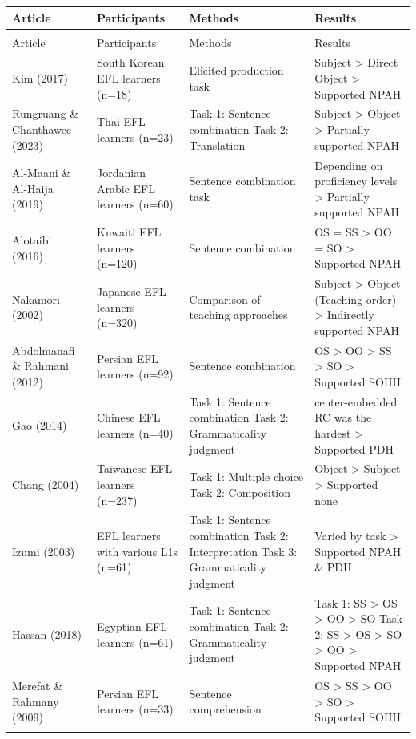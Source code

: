 \documentclass[
]{article}
\begin{document}
\begin{longtable}{>{\raggedright\arraybackslash}p{3cm}>{\raggedright\arraybackslash}p{3.5cm}>{\raggedright\arraybackslash}p{4.5cm}>{\raggedright\arraybackslash}p{5cm}}
\toprule
Article & Participants & Methods & Results\\
\midrule
\endfirsthead
\multicolumn{4}{@{}l}{\textit{(continued)}}\\
\toprule
Article & Participants & Methods & Results\\
\midrule
\endhead

\endfoot
\bottomrule
\endlastfoot
Kim (2017) & South Korean EFL learners (n=18) & Elicited production task & Subject > Direct Object
 > Supported \vphantom{2} NPAH\\
Rungruang \& Chanthawee (2023) & Thai EFL learners (n=23) & Task 1: Sentence combination
Task 2: Translation & Subject > Object
 > Partially supported NPAH\\
Al-Maani \& Al-Haija (2019) & Jordanian Arabic EFL learners (n=60) & Sentence combination task & Depending on proficiency levels 
> Partially supported NPAH\\
Alotaibi (2016) & Kuwaiti EFL learners (n=120) & Sentence combination & OS = SS > OO = SO
 > Supported \vphantom{1} NPAH\\
Nakamori (2002) & Japanese EFL learners (n=320) & Comparison of teaching approaches & Subject > Object (Teaching order)
 > Indirectly supported NPAH\\
\addlinespace
Abdolmanafi \& Rahmani (2012) & Persian EFL learners (n=92) & Sentence combination & OS > OO > SS > SO
 > Supported \vphantom{1} SOHH\\
Gao (2014) & Chinese EFL learners (n=40) & Task 1: Sentence combination
Task 2: Grammaticality judgment & center-embedded RC was the hardest
 > Supported PDH\\
Chang (2004) & Taiwanese EFL learners (n=237) & Task 1: Multiple choice
Task 2: Composition & Object > Subject
 > Supported none\\
Izumi (2003) & EFL learners with various L1s (n=61) & Task 1: Sentence combination
Task 2: Interpretation
Task 3: Grammaticality judgment & Varied by task
 > Supported NPAH \& PDH\\
Hassan (2018) & Egyptian EFL learners (n=61) & Task 1: Sentence combination
Task 2: Grammaticality judgment & Task 1: SS > OS > OO > SO
Task 2: SS > OS > SO > OO
 > Supported NPAH\\
\addlinespace
Merefat \& Rahmany (2009) & Persian EFL learners (n=33) & Sentence comprehension & OS > SS > OO > SO
 > Supported SOHH\\*
\end{longtable}
\endgroup{}
\end{document}
